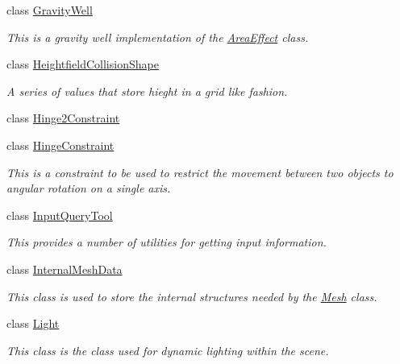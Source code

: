 \begin{DoxyCompactItemize}
class \hyperlink{classMezzanine_1_1GravityWell}{GravityWell}
\begin{DoxyCompactList}\small\item\em This is a gravity well implementation of the \hyperlink{classMezzanine_1_1AreaEffect}{AreaEffect} class. \item\end{DoxyCompactList}\item 
class \hyperlink{classMezzanine_1_1HeightfieldCollisionShape}{HeightfieldCollisionShape}
\begin{DoxyCompactList}\small\item\em A series of values that store hieght in a grid like fashion. \item\end{DoxyCompactList}\item 
class \hyperlink{classMezzanine_1_1Hinge2Constraint}{Hinge2Constraint}
\item 
class \hyperlink{classMezzanine_1_1HingeConstraint}{HingeConstraint}
\begin{DoxyCompactList}\small\item\em This is a constraint to be used to restrict the movement between two objects to angular rotation on a single axis. \item\end{DoxyCompactList}\item 
class \hyperlink{classMezzanine_1_1InputQueryTool}{InputQueryTool}
\begin{DoxyCompactList}\small\item\em This provides a number of utilities for getting input information. \item\end{DoxyCompactList}\item 
class \hyperlink{classMezzanine_1_1InternalMeshData}{InternalMeshData}
\begin{DoxyCompactList}\small\item\em This class is used to store the internal structures needed by the \hyperlink{classMezzanine_1_1Mesh}{Mesh} class. \item\end{DoxyCompactList}\item 
class \hyperlink{classMezzanine_1_1Light}{Light}
\begin{DoxyCompactList}\small\item\em This class is the class used for dynamic lighting within the scene. \item\end{DoxyCompactList}\item 

\end{DoxyCompactItemize}

